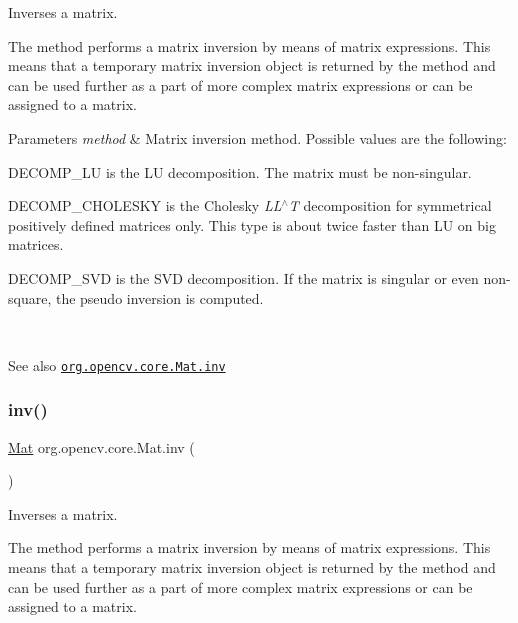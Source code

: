 Inverses a matrix.

The method performs a matrix inversion by means of matrix expressions. This means that a temporary matrix inversion object is returned by the method and can be used further as a part of more complex matrix expressions or can be assigned to a matrix.


\begin{DoxyParams}{Parameters}
{\em method} & Matrix inversion method. Possible values are the following\+: 
\begin{DoxyItemize}
\item D\+E\+C\+O\+M\+P\+\_\+\+LU is the LU decomposition. The matrix must be non-\/singular. 
\item D\+E\+C\+O\+M\+P\+\_\+\+C\+H\+O\+L\+E\+S\+KY is the Cholesky {\itshape L\+L$^\wedge$T} decomposition for symmetrical positively defined matrices only. This type is about twice faster than LU on big matrices. 
\item D\+E\+C\+O\+M\+P\+\_\+\+S\+VD is the S\+VD decomposition. If the matrix is singular or even non-\/square, the pseudo inversion is computed. 
\end{DoxyItemize}\\
\hline
\end{DoxyParams}
\begin{DoxySeeAlso}{See also}
\href{http://docs.opencv.org/modules/core/doc/basic_structures.html#mat-inv}{\tt org.\+opencv.\+core.\+Mat.\+inv} 
\end{DoxySeeAlso}
\mbox{\label{classorg_1_1opencv_1_1core_1_1_mat_a3ae81a587a404aa8b3751af8c0763515}} 
\subsubsection{\texorpdfstring{inv()}{inv()}\hspace{0.1cm}{\footnotesize\ttfamily [2/2]}}
{\footnotesize\ttfamily \mbox{\hyperlink{classorg_1_1opencv_1_1core_1_1_mat}{Mat}} org.\+opencv.\+core.\+Mat.\+inv (\begin{DoxyParamCaption}{ }\end{DoxyParamCaption})}

Inverses a matrix.

The method performs a matrix inversion by means of matrix expressions. This means that a temporary matrix inversion object is returned by the method and can be used further as a part of more complex matrix expressions or can be assigned to a matrix.

